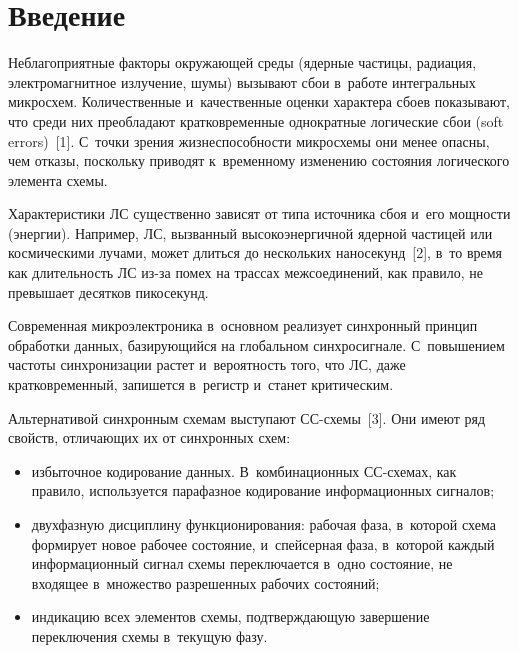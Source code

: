 
  



\thispagestyle{headings}

\begin{multicols}{2}

\label{st\stat}

\section{Введение}

  Неблагоприятные факторы окружающей среды (ядерные частицы, радиация, 
электромагнитное излучение, шумы) вызывают сбои в~работе интегральных 
микросхем. Количественные и~качественные оценки характера сбоев 
показывают, что среди них преобладают кратковременные однократные 
логические сбои (soft errors)~[1]. С~точки зрения жизнеспособности 
микросхемы они менее опасны, чем отказы, поскольку приводят к~временному 
изменению состояния логического элемента схемы.

  
  Характеристики ЛС существенно зависят от типа источника сбоя и~его 
мощности (энергии). Например, ЛС, вызванный высокоэнергичной ядерной 
частицей или космическими лучами, может длиться до нескольких 
наносекунд~[2], в~то время как длительность ЛС из-за помех на трассах 
межсоединений, как правило, не превышает десятков пикосекунд. 
  
  Современная микроэлектроника в~основном реализует синхронный принцип 
обработки данных, базирующийся на глобальном синхросигнале. 
С~повышением частоты синхронизации растет и~вероятность того, что ЛС, 
даже кратковременный, запишется в~регистр и~станет критическим.
  
  Альтернативой синхронным схемам выступают СС-схе\-мы~[3]. 
  Они имеют ряд свойств, отличающих их от синхронных схем:
  \begin{itemize}
\item избыточное кодирование данных. В~комбинационных СС-схе\-мах, как 
правило, используется парафазное кодирование информационных сигналов;
\item двухфазную дисциплину функционирования: рабочая фаза, в~которой 
схема формирует новое рабочее состояние, и~спейсерная фаза, в~которой 
каждый информационный сигнал схемы переключается в~одно состояние, не 
входящее в~множество разрешенных рабочих состояний;
\item индикацию всех элементов схемы, подтверждающую завершение 
переключения схемы в~текущую фазу.
\end{itemize}


\end{multicols}
